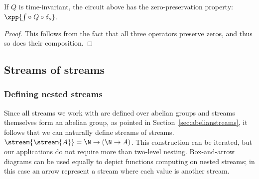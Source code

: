\begin{center}
\end{center}


\begin{proposition}
If $Q$ is time-invariant, the circuit above has the zero-preservation
property: $\zpp{\int \circ\; Q \circ \delta_o}$.
\end{proposition}
\begin{proof}
  This follows from the fact that all three operators preserve zeros, and thus so
  does their composition.
\end{proof}

\subsection{Streams of streams}\label{sec:nested}

\subsubsection{Defining nested streams}

Since all streams we work with are defined over abelian groups
and streams themselves form an abelian group, as pointed in Section~\ref{sec:abelianstreams},
it follows that we can naturally define streams of streams.
$\stream{\stream{A}} = \N \rightarrow (\N \rightarrow A)$.  This construction
can be iterated, but our applications do not require more than
two-level nesting.  Box-and-arrow diagrams can be used equally to
depict functions computing on nested streams; in this case an
arrow represent a stream where each value is another stream.

\newcommand{\ssa}[1]{
\setsepchar{ }
\readlist\arg{#1}
\begin{bmatrix}
   \begin{array}{ccccccc}
        {[} & \arg[1] & \arg[2] & \arg[3] & \arg[4] & \cdots & {]} \\
        {[} & \arg[5] & \arg[6] & \arg[7] & \arg[8] & \cdots & {]} \\
        {[} & \arg[9] & \arg[10] & \arg[11] & \arg[12] & \cdots & {]} \\
        {[} & \arg[13] & \arg[14] & \arg[15] & \arg[16] & \cdots & {]} \\
        \multicolumn{7}{c}{\vdots}
   \end{array}
\end{bmatrix}
}

